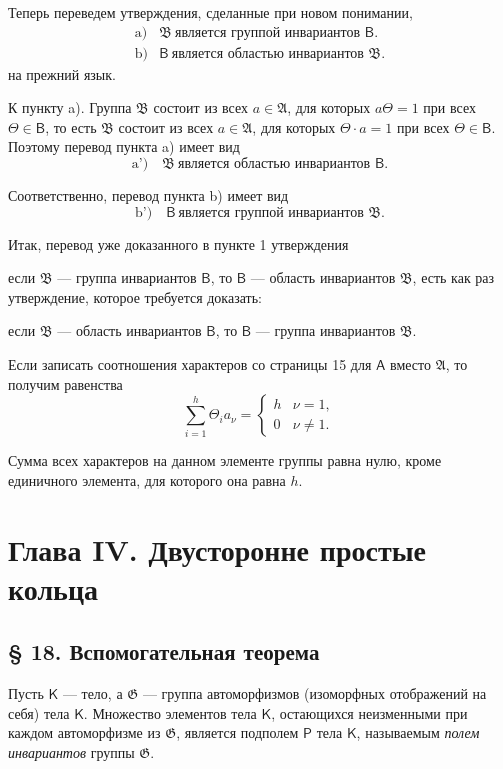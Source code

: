 \documentclass[11pt]{article}
\begin{document}
Теперь переведем утверждения, сделанные при новом понимании,
\[
\begin{array}{ll}
\text{a)}& \mathfrak B\ \text{является группой инвариантов }\mathsf B.\\
\text{b)}& \mathsf B\ \text{является областью инвариантов }\mathfrak B.
\end{array}
\]
на прежний язык.

К пункту a). Группа \(\mathfrak B\) состоит из всех \(a\in\mathfrak A\), для которых \(a\Theta=1\) при всех \(\Theta\in\mathsf B\), то есть \(\mathfrak B\) состоит из всех \(a\in\mathfrak A\), для которых \(\Theta\cdot a=1\) при всех \(\Theta\in\mathsf B\). Поэтому перевод пункта a) имеет вид
\[
\text{a')} \quad \mathfrak B\ \text{является областью инвариантов }\mathsf B.
\]

Соответственно, перевод пункта b) имеет вид
\[
\text{b')} \quad \mathsf B\ \text{является группой инвариантов }\mathfrak B.
\]

Итак, перевод уже доказанного в пункте 1 утверждения

если \(\mathfrak B\) --- группа инвариантов \(\mathsf B\), то \(\mathsf B\) --- область инвариантов \(\mathfrak B\),
есть как раз утверждение, которое требуется доказать:

если \(\mathfrak B\) --- область инвариантов \(\mathsf B\), то \(\mathsf B\) --- группа инвариантов \(\mathfrak B\).

Если записать соотношения характеров со страницы 15 для \(\mathsf A\) вместо \(\mathfrak A\), то получим равенства
\[
\sum_{i=1}^{h} \Theta_i a_\nu =
\begin{cases}
h & \nu=1,\\
0 & \nu\ne 1.
\end{cases}
\]

Сумма всех характеров на данном элементе группы равна нулю, кроме единичного элемента, для которого она равна \(h\).

\section*{Глава IV. Двусторонне простые кольца}\label{kapitel-iv.-zweiseitig-einfache-ringe}

\subsection*{§ 18. Вспомогательная теорема}\label{ein-hilfssatz}

Пусть \(\mathsf K\) --- тело, а \(\mathfrak G\) --- группа автоморфизмов (изоморфных отображений на себя) тела \(\mathsf K\). Множество элементов тела \(\mathsf K\), остающихся неизменными при каждом автоморфизме из \(\mathfrak G\), является подполем \(\mathsf P\) тела \(\mathsf K\), называемым \emph{полем инвариантов} группы \(\mathfrak G\).
\end{document}
